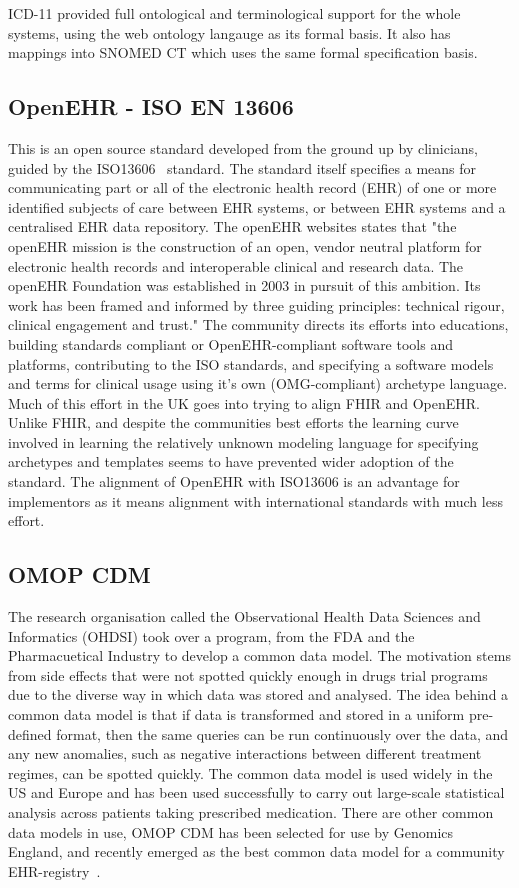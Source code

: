 \documentclass[runningheads]{llncs}
\begin{document}
	ICD-11 provided full ontological and terminological support for the whole systems, using the web ontology langauge as its formal basis. It also has mappings into SNOMED CT which uses the same formal specification basis.
	
	
	\subsection{OpenEHR - ISO EN 13606}
	This is an open source standard developed from the ground up by clinicians, guided by the ISO13606~\cite{ISO13606} standard. The standard itself specifies a means for communicating part or all of the electronic health record (EHR) of one or more identified subjects of care between EHR systems, or between EHR systems and a centralised EHR data repository.
	The openEHR websites states that "the openEHR mission is the construction of an open, vendor neutral platform for electronic health records and interoperable clinical and research data. The openEHR Foundation was established in 2003 in pursuit of this ambition. Its work has been framed and informed by three guiding principles: technical rigour, clinical engagement and trust."
	The community directs its efforts into educations, building standards compliant or OpenEHR-compliant software tools and platforms, contributing to the ISO standards, and specifying a software models and terms for clinical usage using it's own (OMG-compliant) archetype language. Much of this effort in the UK goes into trying to align FHIR and OpenEHR. Unlike FHIR, and despite the communities best efforts the learning curve involved in learning the relatively unknown modeling language for specifying archetypes and templates seems to have prevented wider adoption of the standard. The alignment of OpenEHR with ISO13606 is an advantage for implementors as it means alignment with international standards with much less effort.
	\subsection{OMOP CDM}
	The research organisation called the Observational Health Data Sciences and Informatics (OHDSI) took over a program, from the FDA and the Pharmacuetical Industry to develop a common data model. The motivation stems from side effects that were not spotted quickly enough in drugs trial programs due to the diverse way in which data was stored and analysed. The idea behind a common data model is that if data is transformed and stored in a uniform pre-defined format, then the same queries can be run continuously over the data, and any new anomalies, such as negative interactions between different treatment regimes, can be spotted quickly. The common data model is used widely in the US and Europe and has been used successfully to carry out large-scale statistical analysis across patients taking prescribed medication. There are other common data models in use, OMOP CDM has been selected for use by Genomics England, and recently emerged as the best common data model for a community EHR-registry~\cite{GARZA2016333}.
\end{document}
